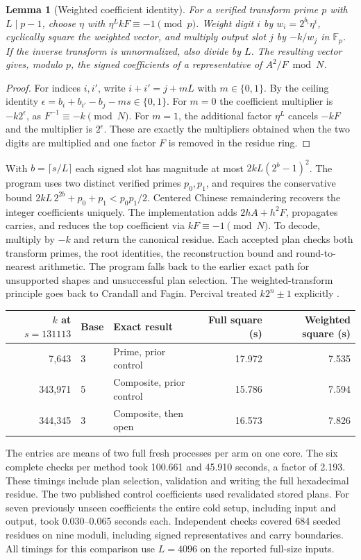 \documentclass[11pt,a4paper,oneside,openany]{report}
\newtheorem{lemma}[theorem]{Lemma}
\begin{document}
\begin{lemma}[Weighted coefficient identity]
For a verified transform prime $p$ with $L\mid p-1$, choose $\eta$ with $\eta^L kF\equiv-1\pmod p$. Weight digit $i$ by $w_i=2^{b_i}\eta^i$, cyclically square the weighted vector, and multiply output slot $j$ by $-k/w_j$ in $\mathbb F_p$. If the inverse transform is unnormalized, also divide by $L$. The resulting vector gives, modulo $p$, the signed coefficients of a representative of $A^2/F\bmod N$.
\end{lemma}
\begin{proof}
For indices $i,i'$, write $i+i'=j+mL$ with $m\in\{0,1\}$. By the ceiling identity $\epsilon=b_i+b_{i'}-b_j-ms\in\{0,1\}$. For $m=0$ the coefficient multiplier is $-k2^\epsilon$, as $F^{-1}\equiv-k\pmod N$. For $m=1$, the additional factor $\eta^L$ cancels $-kF$ and the multiplier is $2^\epsilon$. These are exactly the multipliers obtained when the two digits are multiplied and one factor $F$ is removed in the residue ring.
\end{proof}

With $b=\lceil s/L\rceil$ each signed slot has magnitude at most $2kL(2^b-1)^2$. The program uses two distinct verified primes $p_0,p_1$, and requires the conservative bound $2kL\,2^{2b}+p_0+p_1<p_0p_1/2$. Centered Chinese remaindering recovers the integer coefficients uniquely. The implementation adds $2hA+h^2F$, propagates carries, and reduces the top coefficient via $kF\equiv-1\pmod N$. To decode, multiply by $-k$ and return the canonical residue. Each accepted plan checks both transform primes, the root identities, the reconstruction bound and round-to-nearest arithmetic. The program falls back to the earlier exact path for unsupported shapes and unsuccessful plan selection. The weighted-transform principle goes back to Crandall and Fagin. Percival treated $k2^n\pm1$ explicitly \cite{cf,percival}.

\begin{center}\small
\begin{tabular}{@{}rllrr@{}}\toprule
$k$ at $s=131113$ & Base & Exact result & Full square (s) & Weighted square (s)\\\midrule
7,643   &3&Prime, prior control &17.972&7.535\\
343,971 &5&Composite, prior control &15.786&7.594\\
344,345 &3&Composite, then open     &16.573&7.826\\\bottomrule
\end{tabular}
\end{center}
The entries are means of two full fresh processes per arm on one core. The six complete checks per method took 100.661 and 45.910 seconds, a factor of 2.193. These timings include plan selection, validation and writing the full hexadecimal residue. The two published control coefficients used revalidated stored plans. For seven previously unseen coefficients the entire cold setup, including input and output, took 0.030--0.065 seconds each. Independent checks covered 684 seeded residues on nine moduli, including signed representatives and carry boundaries. All timings for this comparison use $L=4096$ on the reported full-size inputs.
\end{document}
